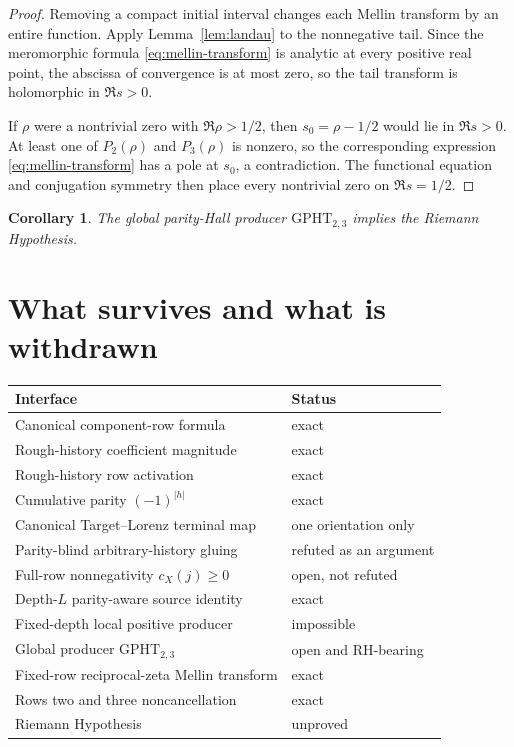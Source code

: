 \documentclass[11pt]{article}
\newtheorem{corollary}[theorem]{Corollary}
\newcommand{\1}{\mathbf 1}
\newcommand{\GPHT}{\mathrm{GPHT}_{2,3}}
\begin{document}
\begin{proof}
Removing a compact initial interval changes each Mellin transform by an entire
function.  Apply Lemma~\ref{lem:landau} to the nonnegative tail.  Since the
meromorphic formula \eqref{eq:mellin-transform} is analytic at every positive
real point, the abscissa of convergence is at most zero, so the tail transform
is holomorphic in $\Re s>0$.

If $\rho$ were a nontrivial zero with $\Re\rho>1/2$, then
$s_0=\rho-1/2$ would lie in $\Re s>0$.  At least one of $P_2(\rho)$ and
$P_3(\rho)$ is nonzero, so the corresponding expression
\eqref{eq:mellin-transform} has a pole at $s_0$, a contradiction.  The
functional equation and conjugation symmetry then place every nontrivial zero
on $\Re s=1/2$.
\end{proof}

\begin{corollary}
The global parity-Hall producer $\GPHT$ implies the Riemann Hypothesis.
\end{corollary}

\section{What survives and what is withdrawn}

\begin{center}
\begin{tabular}{p{}p{}}
\toprule
Interface & Status \\
\midrule
Canonical component-row formula & exact \\
Rough-history coefficient magnitude & exact \\
Rough-history row activation & exact \\
Cumulative parity $(-1)^{|h|}$ & exact \\
Canonical Target--Lorenz terminal map & one orientation only \\
Parity-blind arbitrary-history gluing & refuted as an argument \\
Full-row nonnegativity $c_X(j)\ge0$ & open, not refuted \\
Depth-$L$ parity-aware source identity & exact \\
Fixed-depth local positive producer & impossible \\
Global producer $\GPHT$ & open and RH-bearing \\
Fixed-row reciprocal-zeta Mellin transform & exact \\
Rows two and three noncancellation & exact \\
Riemann Hypothesis & unproved \\
\bottomrule
\end{tabular}
\end{center}
\end{document}
